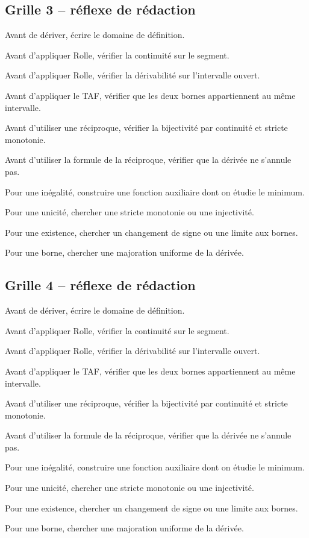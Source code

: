 \documentclass[11pt,a4paper]{article}
\begin{document}
\subsection*{Grille 3 -- réflexe de rédaction}

\begin{methodebox}

Avant de dériver, écrire le domaine de définition.

Avant d'appliquer Rolle, vérifier la continuité sur le segment.

Avant d'appliquer Rolle, vérifier la dérivabilité sur l'intervalle ouvert.

Avant d'appliquer le TAF, vérifier que les deux bornes appartiennent au même intervalle.

Avant d'utiliser une réciproque, vérifier la bijectivité par continuité et stricte monotonie.

Avant d'utiliser la formule de la réciproque, vérifier que la dérivée ne s'annule pas.

Pour une inégalité, construire une fonction auxiliaire dont on étudie le minimum.

Pour une unicité, chercher une stricte monotonie ou une injectivité.

Pour une existence, chercher un changement de signe ou une limite aux bornes.

Pour une borne, chercher une majoration uniforme de la dérivée.

\end{methodebox}

\subsection*{Grille 4 -- réflexe de rédaction}

\begin{methodebox}

Avant de dériver, écrire le domaine de définition.

Avant d'appliquer Rolle, vérifier la continuité sur le segment.

Avant d'appliquer Rolle, vérifier la dérivabilité sur l'intervalle ouvert.

Avant d'appliquer le TAF, vérifier que les deux bornes appartiennent au même intervalle.

Avant d'utiliser une réciproque, vérifier la bijectivité par continuité et stricte monotonie.

Avant d'utiliser la formule de la réciproque, vérifier que la dérivée ne s'annule pas.

Pour une inégalité, construire une fonction auxiliaire dont on étudie le minimum.

Pour une unicité, chercher une stricte monotonie ou une injectivité.

Pour une existence, chercher un changement de signe ou une limite aux bornes.

Pour une borne, chercher une majoration uniforme de la dérivée.

\end{methodebox}
\end{document}
